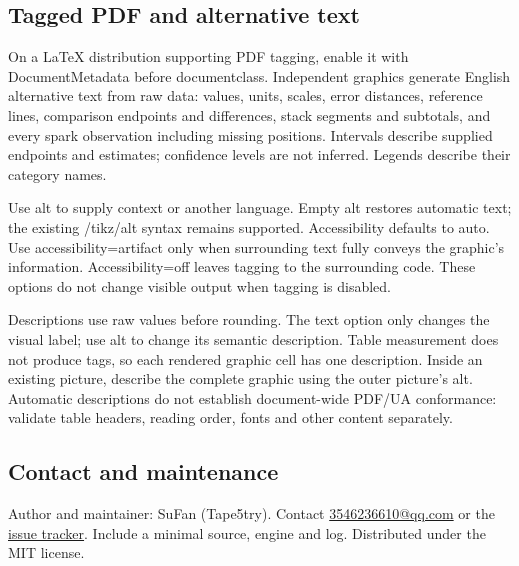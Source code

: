 \subsection{Tagged PDF and alternative text}
On a LaTeX distribution supporting PDF tagging, enable it with DocumentMetadata
before documentclass. Independent graphics generate English alternative text from
raw data: values, units, scales, error distances, reference lines, comparison
endpoints and differences, stack segments and subtotals, and every spark observation
including missing positions. Intervals describe supplied endpoints and estimates;
confidence levels are not inferred. Legends describe their category names.

Use alt to supply context or another language. Empty alt restores automatic text;
the existing /tikz/alt syntax remains supported. Accessibility defaults to auto.
Use accessibility=artifact only when surrounding text fully conveys the graphic's
information. Accessibility=off leaves tagging to the surrounding code. These options
do not change visible output when tagging is disabled.

Descriptions use raw values before rounding. The text option only changes the
visual label; use alt to change its semantic description. Table measurement does
not produce tags, so each rendered graphic cell has one description. Inside an
existing \manualTikZ{} picture, describe the complete graphic using the outer picture's alt.
Automatic descriptions do not establish document-wide PDF/UA conformance: validate
table headers, reading order, fonts and other content separately.

\subsection*{Contact and maintenance}
Author and maintainer: SuFan (Tape5try).
Contact \href{mailto:3546236610@qq.com}{3546236610@qq.com} or the
\href{https://github.com/Tape5try/gradbars/issues}{issue tracker}.
Include a minimal source, engine and log. Distributed under the MIT license.
